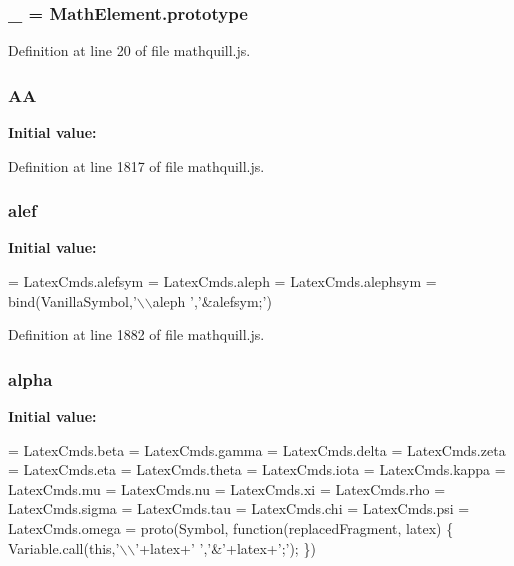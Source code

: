 \subsubsection[{\-\_\-}]{\setlength{\rightskip}{0pt plus 5cm}\-\_\- = {\bf Math\-Element.\-prototype}}\label{mathquill_8js_a18f05aeddc212b523b40818fa2b87b33}


Definition at line 20 of file mathquill.\-js.

\subsubsection[{A\-A}]{ A\-A}\label{mathquill_8js_a99d28c413be6a35cae6e7965041f987a}
{\bfseries Initial value\-:}


Definition at line 1817 of file mathquill.\-js.

\subsubsection[{alef}]{ alef}\label{mathquill_8js_a0586b669abc15ba04ce1e9d2aff56456}
{\bfseries Initial value\-:}
\begin{DoxyCode}
= LatexCmds.alefsym = LatexCmds.aleph = LatexCmds.alephsym =
  bind(VanillaSymbol,\textcolor{stringliteral}{'\(\backslash\)\(\backslash\)aleph '},\textcolor{stringliteral}{'&alefsym;'})
\end{DoxyCode}


Definition at line 1882 of file mathquill.\-js.

\subsubsection[{alpha}]{ alpha}\label{mathquill_8js_a24c6874a257d093fa6e97028a8936d62}
{\bfseries Initial value\-:}
\begin{DoxyCode}
=
LatexCmds.beta =
LatexCmds.gamma =
LatexCmds.delta =
LatexCmds.zeta =
LatexCmds.eta =
LatexCmds.theta =
LatexCmds.iota =
LatexCmds.kappa =
LatexCmds.mu =
LatexCmds.nu =
LatexCmds.xi =
LatexCmds.rho =
LatexCmds.sigma =
LatexCmds.tau =
LatexCmds.chi =
LatexCmds.psi =
LatexCmds.omega = proto(Symbol, \textcolor{keyword}{function}(replacedFragment, latex) \{
  Variable.call(\textcolor{keyword}{this},\textcolor{charliteral}{'\(\backslash\)\(\backslash\)'}+latex+\textcolor{charliteral}{' '},\textcolor{charliteral}{'&'}+latex+\textcolor{charliteral}{';'});
\})
\end{DoxyCode}


